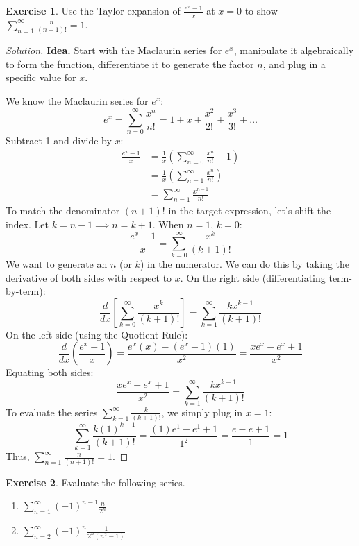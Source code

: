 \documentclass[11pt]{article}
\theoremstyle{definition}
\newtheorem{exercise}{Exercise}[section]
\newenvironment{solution}{\begin{proof}[Solution]}{\end{proof}}
\begin{document}
\begin{exercise}
Use the Taylor expansion of $\frac{e^x-1}{x}$ at $x=0$ to show $\displaystyle \sum_{n=1}^{\infty}\frac{n}{(n+1)!}=1$.
\end{exercise}

\begin{solution}
\textbf{Idea.} Start with the Maclaurin series for $e^x$, manipulate it algebraically to form the function, differentiate it to generate the factor $n$, and plug in a specific value for $x$.

We know the Maclaurin series for $e^x$:
\[
e^x = \sum_{n=0}^{\infty} \frac{x^n}{n!} = 1 + x + \frac{x^2}{2!} + \frac{x^3}{3!} + \dots
\]
Subtract 1 and divide by $x$:
\begin{align*}
\frac{e^x-1}{x} &= \frac{1}{x} \left( \sum_{n=0}^{\infty} \frac{x^n}{n!} - 1 \right) \\
&= \frac{1}{x} \left( \sum_{n=1}^{\infty} \frac{x^n}{n!} \right) \\
&= \sum_{n=1}^{\infty} \frac{x^{n-1}}{n!}
\end{align*}
To match the denominator $(n+1)!$ in the target expression, let's shift the index. Let $k = n-1 \implies n = k+1$. When $n=1$, $k=0$:
\[
\frac{e^x-1}{x} = \sum_{k=0}^{\infty} \frac{x^k}{(k+1)!}
\]
We want to generate an $n$ (or $k$) in the numerator. We can do this by taking the derivative of both sides with respect to $x$.
On the right side (differentiating term-by-term):
\[
\frac{d}{dx} \left[ \sum_{k=0}^{\infty} \frac{x^k}{(k+1)!} \right] = \sum_{k=1}^{\infty} \frac{k x^{k-1}}{(k+1)!}
\]
On the left side (using the Quotient Rule):
\[
\frac{d}{dx} \left( \frac{e^x-1}{x} \right) = \frac{e^x(x) - (e^x-1)(1)}{x^2} = \frac{xe^x - e^x + 1}{x^2}
\]
Equating both sides:
\[
\frac{xe^x - e^x + 1}{x^2} = \sum_{k=1}^{\infty} \frac{k x^{k-1}}{(k+1)!}
\]
To evaluate the series $\sum_{k=1}^{\infty} \frac{k}{(k+1)!}$, we simply plug in $x=1$:
\[
\sum_{k=1}^{\infty} \frac{k (1)^{k-1}}{(k+1)!} = \frac{(1)e^1 - e^1 + 1}{1^2} = \frac{e - e + 1}{1} = 1
\]
Thus, $\sum_{n=1}^{\infty}\frac{n}{(n+1)!} = 1$.
\end{solution}

\begin{exercise}
Evaluate the following series.
\begin{enumerate}
    \item $\displaystyle \sum_{n=1}^{\infty} (-1)^{n-1}\frac{n}{2^n}$
    \item $\displaystyle \sum_{n=2}^{\infty} (-1)^{n}\frac{1}{2^n(n^2-1)}$
\end{enumerate}
\end{exercise}
\end{document}
